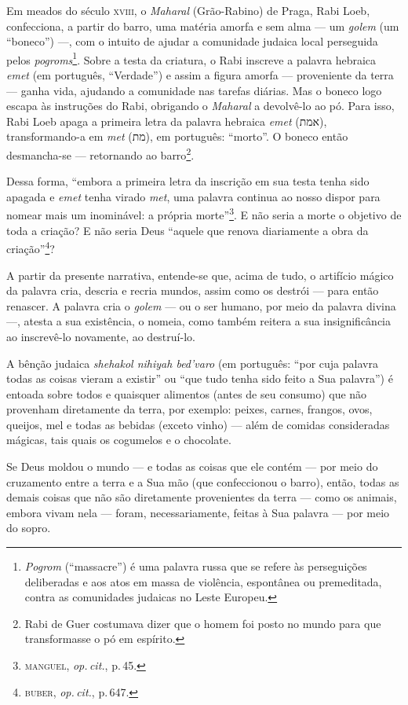 Em meados do século \textsc{xviii}, o \emph{Maharal} (Grão-Rabino) de Praga, Rabi
Loeb, confecciona, a partir do barro, uma matéria amorfa e sem alma ---
um \emph{golem} (um ``boneco'') ---, com o intuito de ajudar a
comunidade judaica local perseguida pelos \emph{pogroms}\footnote{\emph{Pogrom}
  (``massacre'') é uma palavra russa que se refere às perseguições
  deliberadas e aos atos em massa de violência, espontânea ou
  premeditada, contra as comunidades judaicas no Leste Europeu.}. Sobre
a testa da criatura, o Rabi inscreve a palavra hebraica \emph{emet} (em
português, ``Verdade'') e assim a figura amorfa --- proveniente da terra
--- ganha vida, ajudando a comunidade nas tarefas diárias. Mas o boneco
logo escapa às instruções do Rabi, obrigando o \emph{Maharal} a
devolvê-lo ao pó. Para isso, Rabi Loeb apaga a primeira letra da palavra
hebraica \emph{emet} ({אמת}), transformando-a em \emph{met}
({מת}), em português: ``morto''. O boneco então desmancha-se ---
retornando ao barro\footnote{Rabi de Guer costumava dizer que o homem
  foi posto no mundo para que transformasse o pó em espírito.}.

Dessa forma, ``embora a primeira letra da inscrição em sua testa
tenha sido apagada e \emph{emet} tenha virado \emph{met}, uma palavra continua ao
nosso dispor para nomear mais um inominável: a própria
morte''\footnote{\textsc{manguel}, \emph{op.\,cit.}, p.\,45.}. E não seria a morte o
objetivo de toda a criação? E não seria Deus ``aquele que renova
diariamente a obra da criação''\footnote{\textsc{buber}, \emph{op.\,cit.}, p.\,647.}?

A partir da presente narrativa, entende-se que, acima de tudo, o
artifício mágico da palavra cria, descria e recria mundos, assim como os
destrói --- para então renascer. A palavra cria o \emph{golem} --- ou o
ser humano, por meio da palavra divina ---, atesta a sua existência, o
nomeia, como também reitera a sua insignificância ao inscrevê-lo
novamente, ao destruí-lo.

A bênção judaica \emph{shehakol nihiyah bed'varo} (em português:
``por cuja palavra todas as coisas vieram a existir'' ou ``que tudo
tenha sido feito a Sua palavra'') é entoada sobre todos e quaisquer
alimentos (antes de seu consumo) que não provenham diretamente da terra,
por exemplo: peixes, carnes, frangos, ovos, queijos, mel e todas as
bebidas (exceto vinho) --- além de comidas consideradas mágicas, tais
quais os cogumelos e o chocolate.

Se Deus moldou o mundo --- e todas as coisas que ele contém --- por meio
do cruzamento entre a terra e a Sua mão (que confeccionou o barro),
então, todas as demais coisas que não são diretamente provenientes da
terra --- como os animais, embora vivam nela --- foram, necessariamente,
feitas à Sua palavra --- por meio do sopro.

